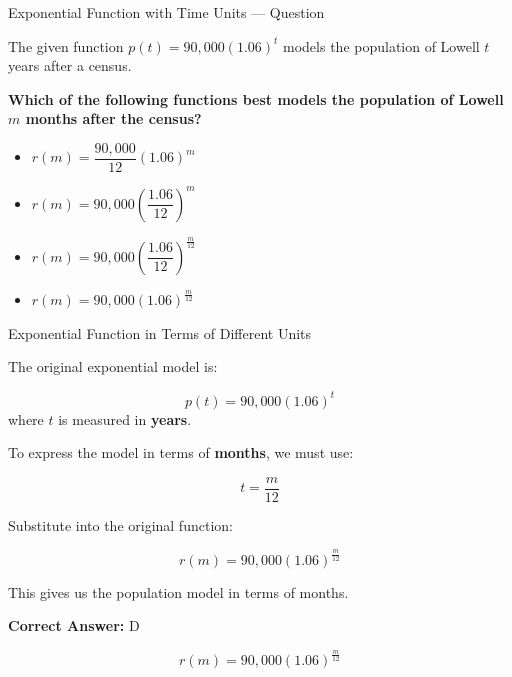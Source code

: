 \documentclass{beamer}
\begin{document}
\begin{frame}{Exponential Function with Time Units — Question}
\small

The given function $p(t) = 90,\!000(1.06)^t$ models the population of Lowell $t$ years after a census.

\textbf{Which of the following functions best models the population of Lowell $m$ months after the census?}

\vspace{0.3cm}
\begin{itemize}
    \item[A.] \( r(m) = \dfrac{90,\!000}{12}(1.06)^m \)
    \item[B.] \( r(m) = 90,\!000 \left( \dfrac{1.06}{12} \right)^m \)
    \item[C.] \( r(m) = 90,\!000 \left( \dfrac{1.06}{12} \right)^{\frac{m}{12}} \)
    \item[D.] \( r(m) = 90,\!000(1.06)^{\frac{m}{12}} \)
\end{itemize}
\end{frame}




\begin{frame}{Exponential Function in Terms of Different Units}
\small

The original exponential model is:

\[
p(t) = 90{,}000(1.06)^t
\]
where $t$ is measured in \textbf{years}.

\vspace{0.3cm}
To express the model in terms of \textbf{months}, we must use:

\[
t = \frac{m}{12}
\]

Substitute into the original function:

\[
r(m) = 90{,}000(1.06)^{\frac{m}{12}}
\]

This gives us the population model in terms of months.

\vspace{0.3cm}
\textbf{Correct Answer:} D

\[
\boxed{r(m) = 90{,}000(1.06)^{\frac{m}{12}}}
\]



\end{frame}
\end{document}
